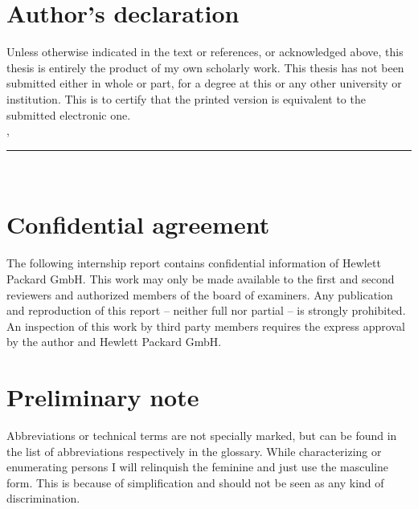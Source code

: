 \thispagestyle{empty}

\section*{Author's declaration}
\vspace*{2em}
Unless otherwise indicated in the text or references, or acknowledged above, this thesis is entirely the product of my own scholarly work. This thesis has not been submitted either in whole or part, for a degree at this or any other university or institution. This is to certify that the printed version is equivalent to the submitted electronic one.
\vspace{2em}\\
\abgabeort, \datumAbgabe
\vspace{3em}\\
\rule{6cm}{0.4pt}\\
\autor
\vspace*{2em}

\section*{Confidential agreement}

\vspace*{2em}
The following internship report contains confidential information of Hewlett Packard GmbH.
This work may only be made available to the first and second reviewers and authorized members of the board of examiners. Any publication and reproduction of this report – neither full nor partial – is strongly prohibited. An inspection of this work by third party members requires the express approval by the author and Hewlett Packard GmbH.
\vspace{2em}

\section*{Preliminary note}

\vspace*{2em}
Abbreviations or technical terms are not specially marked, but can be found in the list of abbreviations respectively in the glossary. While characterizing or enumerating persons I will relinquish the feminine and just use the masculine form. This is because of simplification and should not be seen as any kind of discrimination. 


